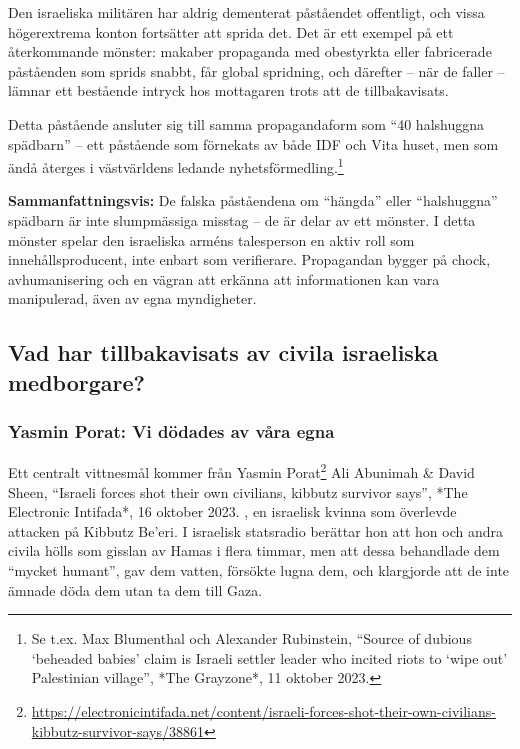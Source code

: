 Den israeliska militären har aldrig dementerat påståendet offentligt, och vissa högerextrema konton fortsätter att sprida det. Det är ett exempel på ett återkommande mönster: makaber propaganda med obestyrkta eller fabricerade påståenden som sprids snabbt, får global spridning, och därefter – när de faller – lämnar ett bestående intryck hos mottagaren trots att de tillbakavisats.

Detta påstående ansluter sig till samma propagandaform som “40 halshuggna spädbarn” – ett påstående som förnekats av både IDF och Vita huset, men som ändå återges i västvärldens ledande nyhetsförmedling.\footnote{Se t.ex. Max Blumenthal och Alexander Rubinstein, “Source of dubious ‘beheaded babies’ claim is Israeli settler leader who incited riots to ‘wipe out’ Palestinian village”, *The Grayzone*, 11 oktober 2023.}

\textbf{Sammanfattningsvis:} De falska påståendena om “hängda” eller “halshuggna” spädbarn är inte slumpmässiga misstag – de är delar av ett mönster. I detta mönster spelar den israeliska arméns talesperson en aktiv roll som innehållsproducent, inte enbart som verifierare. Propagandan bygger på chock, avhumanisering och en vägran att erkänna att informationen kan vara manipulerad, även av egna myndigheter.


\subsection*{Vad har tillbakavisats av civila israeliska medborgare?}

\subsubsection*{Yasmin Porat: Vi dödades av våra egna}
Ett centralt vittnesmål kommer från Yasmin Porat\footnote{\url{https://electronicintifada.net/content/israeli-forces-shot-their-own-civilians-kibbutz-survivor-says/38861}} Ali Abunimah \& David Sheen, “Israeli forces shot their own civilians, kibbutz survivor says”, *The Electronic Intifada*, 16 oktober 2023.
, en israelisk kvinna som överlevde attacken på Kibbutz Be’eri. I israelisk statsradio berättar hon att hon och andra civila hölls som gisslan av Hamas i flera timmar, men att dessa behandlade dem “mycket humant”, gav dem vatten, försökte lugna dem, och klargjorde att de inte ämnade döda dem utan ta dem till Gaza.

